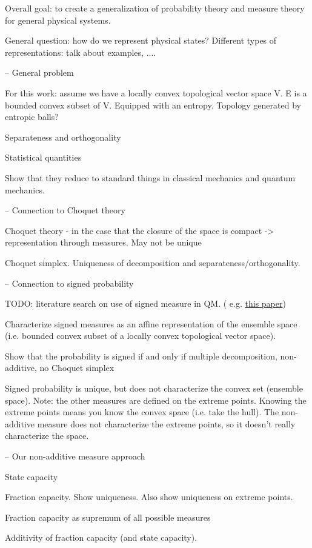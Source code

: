 \documentclass[10pt,twocolumn, nofootinbib]{revtex4-2}
\begin{document}
Overall goal: to create a generalization of probability theory and measure theory for general physical systems.


General question: how do we represent physical states? Different types of representations: talk about examples, ....

-- General problem

For this work: assume we have a locally convex topological vector space V. E is a bounded convex subset of V. Equipped with an entropy. Topology generated by entropic balls?

Separateness and orthogonality

Statistical quantities

Show that they reduce to standard things in classical mechanics and quantum mechanics.

-- Connection to Choquet theory 

Choquet theory - in the case that the closure of the space is compact -> representation through measures. May not be unique

Choquet simplex. Uniqueness of decomposition and separateness/orthogonality.

-- Connection to signed probability

TODO: literature search on use of signed measure in QM. ( e.g. \href{https://arxiv.org/pdf/2302.00118}{this paper})

Characterize signed measures as an affine representation of the ensemble space (i.e. bounded convex subset of a locally convex topological vector space).

Show that the probability is signed if and only if multiple decomposition, non-additive, no Choquet simplex

Signed probability is unique, but does not characterize the convex set (ensemble space). Note: the other measures are defined on the extreme points. Knowing the extreme points means you know the convex space (i.e. take the hull). The non-additive measure does not characterize the extreme points, so it doesn't really characterize the space.

-- Our non-additive measure approach

State capacity

Fraction capacity. Show uniqueness. Also show uniqueness on extreme points.

Fraction capacity as supremum of all possible measures

Additivity of fraction capacity (and state capacity).
\end{document}

